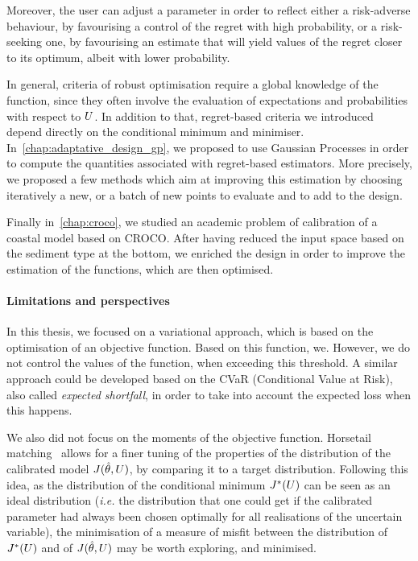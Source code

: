 \documentclass[../../Main_ManuscritThese.tex]{subfiles}
\begin{document}
Moreover, the user can adjust a parameter in order to reflect either a
risk-adverse behaviour, by favourising a control of the regret with
high probability, or a risk-seeking one, by favourising an estimate
that will yield values of the regret closer to its optimum, albeit
with lower probability.


In general, criteria of robust optimisation require a global
knowledge of the function, since they often involve the evaluation of
expectations and probabilities with respect to $U$. In addition to
that, regret-based criteria we introduced depend directly on the
conditional minimum and minimiser. In~\cref{chap:adaptative_design_gp},
we proposed to use Gaussian Processes in order to compute the
quantities associated with regret-based estimators. More precisely, we
proposed a few methods which aim at improving this estimation by
choosing iteratively a new, or a batch of new points to evaluate and
to add to the design.

Finally in~\cref{chap:croco}, we studied an academic problem of
calibration of a coastal model based on CROCO. After having reduced
the input space based on the sediment type at the bottom, we enriched
the design in order to improve the estimation of the functions, which
are then optimised.

\paragraph{Limitations and perspectives}

In this thesis, we focused on a variational approach, which is based
on the optimisation of an objective function. Based on this function,
we. However, we do not control the values of the function, when
exceeding this threshold. A similar approach could be developed based
on the CVaR (Conditional Value at Risk), also called \emph{expected
  shortfall}, in order to take into account the expected loss when
this happens.

We also did not focus on the moments of the objective
function.  Horsetail
matching~\cite{cook_extending_2017,cook_horsetail_2018} allows for a
finer tuning of the properties of the distribution of the calibrated
model $J(\hat{\theta},U)$, by comparing it to a target
distribution. Following this idea, as the distribution of the
conditional minimum $J^*(U)$ can be seen as an ideal distribution
(\emph{i.e.} the distribution that one could get if the calibrated
parameter had always been chosen optimally for all realisations of the
uncertain variable), the minimisation of a measure of misfit between
the distribution of $J^*(U)$ and of $J(\hat{\theta},U)$ may be worth
exploring, and minimised.
\end{document}
